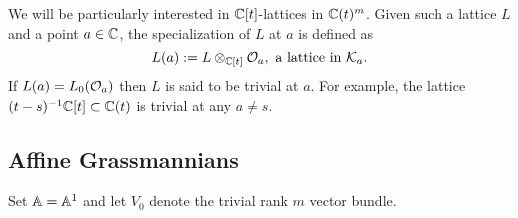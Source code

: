 \documentclass[draft]{article}
\begin{document}
We will be particularly interested in $\CC[t]$-lattices in $ \CC(t)^m$.  Given such a lattice $ L $ and a point $ a \in \CC$, the specialization of $ L $ at $ a $ is defined as
$$
L(a) := L \otimes_{\CC[t]} \cO_a, \text{ a lattice in } \cK_a.  %
$$
If $ L(a) = L_0(\cO_a)$ then $L$ is said to be trivial at $a$. 
For example, the lattice $(t-s)^{-1}\CC[t] \subset \CC(t)$ is trivial at any $a\ne s$. 






\subsection{Affine Grassmannians} %
Set $\AA = \AA^1$ and let $V_0$ denote the trivial rank $ m $ vector bundle. 

\end{document}

